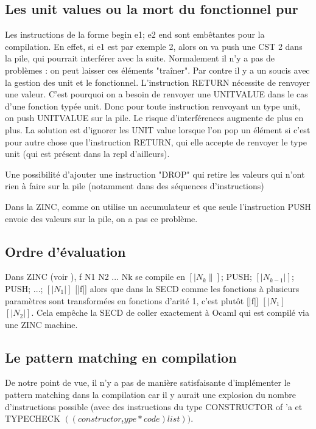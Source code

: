 \documentclass[paper=a4, fontsize=11pt, twocolumn]{article}
\begin{document}
\subsection{Les unit values ou la mort du fonctionnel pur}
Les instructions de la forme 
begin e1; e2 end sont embêtantes pour la compilation. En effet, si e1 est par exemple 2, alors on va push une CST 2 dans la pile, qui pourrait interférer avec la suite.
Normalement il n'y a pas de problèmes : on peut laisser ces éléments "traîner". Par contre il y a un soucis avec la gestion des unit et le fonctionnel.
L'instruction RETURN nécessite de renvoyer une valeur. C'est pourquoi on a besoin de renvoyer une UNITVALUE dans le cas d'une fonction typée unit. Donc pour toute instruction renvoyant un type unit, on push UNITVALUE sur la pile. Le risque d'interférences augmente de plus en plus.
La solution est d'ignorer les UNIT value lorsque l'on pop un élément si c'est pour autre chose que l'instruction RETURN, qui elle accepte de renvoyer le type unit (qui est présent dans la repl d'ailleurs).

Une possibilité d'ajouter une instruction "DROP" qui retire les valeurs qui n'ont rien à faire sur la pile (notamment dans des séquences d'instructions)

Dans la ZINC, comme on utilise un accumulateur et que seule l'instruction PUSH envoie des valeurs sur la pile, on a pas ce problème.

\subsection{Ordre d'évaluation}
Dans ZINC (voir \cite{leroyzinc}), f N1 N2 ... Nk se compile en $[|N_k\|]$; PUSH; $[|N_{k-1}|]$; PUSH; ...; $[|N_1|]$ [|f|] alors que dans la SECD comme les fonctions à plusieurs paramètres sont transformées en fonctions d'arité 1, c'est plutôt
[|f|] $[|N_1]$ $[|N_2|]$. Cela empêche la SECD de coller exactement à Ocaml qui est compilé via une ZINC machine.

\subsection{Le pattern matching en compilation}
De notre point de vue, il n'y a pas de manière satisfaisante d'implémenter le pattern matching dans la compilation car il y aurait une explosion du nombre d'instructions possible (avec des instructions du type CONSTRUCTOR of 'a et TYPECHECK $((constructor_type * code) list))$.
\end{document}
